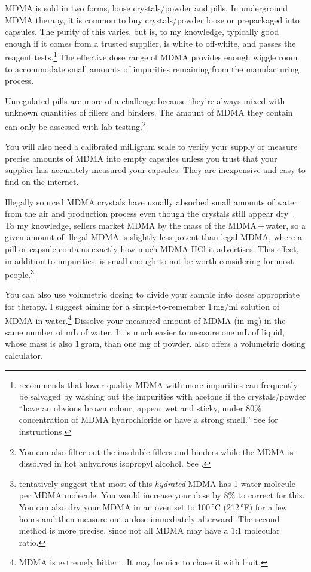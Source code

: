 \documentclass[11pt,oneside]{book}
\let\cite\parencite
\begin{document}
MDMA is sold in two forms, loose crystals/powder and pills. In underground MDMA therapy, it is common to buy crystals/powder loose or prepackaged into capsules. The purity of this varies, but is, to my knowledge, typically good enough if it comes from a trusted supplier, is white to off-white, and passes the reagent tests.\footnote{\textcite{boraxAcetone} recommends that lower quality MDMA with more impurities can frequently be salvaged by washing out the impurities with acetone if the crystals/powder \enquote{have an obvious brown colour, appear wet and sticky, under 80\% concentration of MDMA hydrochloride or have a strong smell.} See \textcite{boraxAcetone} for instructions.} The effective dose range of MDMA provides enough wiggle room to accommodate small amounts of impurities remaining from the manufacturing process.

Unregulated pills are more of a challenge because they're always mixed with unknown quantities of fillers and binders. The amount of MDMA they contain can only be assessed with lab testing.\footnote{You can also filter out the insoluble fillers and binders while the MDMA is dissolved in hot anhydrous isopropyl alcohol. See \textcite{feilongIsopropyl}.}

You will also need a calibrated milligram scale to verify your supply or measure precise amounts of MDMA into empty capsules unless you trust that your supplier has accurately measured your capsules. They are inexpensive and easy to find on the internet.

Illegally sourced MDMA crystals have usually absorbed small amounts of water from the air and production process even though the crystals still appear dry~\cite{kranenburgHydration}. To my knowledge, sellers market MDMA by the mass of the MDMA\,+\,water, so a given amount of illegal MDMA is slightly less potent than legal MDMA, where a pill or capsule contains exactly how much MDMA HCl it advertises. This effect, in addition to impurities, is small enough to not be worth considering for most people.\footnote{\textcite{kranenburgHydration,nairSynthesis} tentatively suggest that most of this \textit{hydrated} MDMA has 1 water molecule per MDMA molecule. You would increase your dose by 8\% to correct for this. You can also dry your MDMA in an oven set to 100\,°C (212\,°F) for a few hours and then measure out a dose immediately afterward. The second method is more precise, since not all MDMA may have a 1:1 molecular ratio.}

You can also use volumetric dosing to divide your sample into doses appropriate for therapy. I suggest aiming for a simple-to-remember 1\,mg/ml solution of MDMA in water.\footnote{MDMA is extremely bitter~\cite{milivcevic2020bitter}. It may be nice to chase it with fruit.} Dissolve your measured amount of MDMA (in mg) in the same number of mL of water. It is much easier to measure one mL of liquid, whose mass is also 1\,gram, than one mg of powder. \textcite{volumetricDilution} also offers a volumetric dosing calculator.
\end{document}
